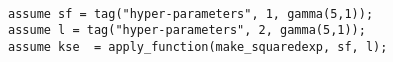 \begin{lstlisting}[mathescape,escapechar=\#]

assume sf = tag("hyper-parameters", 1, gamma(5,1));
assume l = tag("hyper-parameters", 2, gamma(5,1));
assume kse  = apply_function(make_squaredexp, sf, l);

\end{lstlisting}
